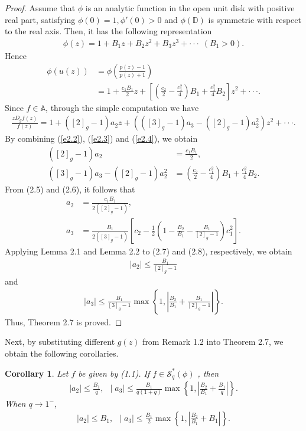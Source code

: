 \documentclass[11pt,twoside, reqno]{article}
\newtheorem{corollary}[theorem]{Corollary}
\theoremstyle{definition}
\begin{document}
\begin{proof}
Assume that $\phi$ is an analytic function in the open unit disk with positive real part, satisfying $\phi(0)=1, \phi'(0)>0$ and $\phi(\mathbb{D})$ is symmetric with respect to the real axis. Then, it has the following representation
\begin{align}
\phi(z)=1+B_{1}z+B_{2}z^{2}+B_{3}z^{3}+\cdot\cdot\cdot\ \ (B_{1}>0)\nonumber.
\end{align}
Hence
\begin{align}\nonumber\label{e2.3}
\phi(u(z))&=\phi\left(\frac{p(z) - 1}{p(z) + 1}\right)\\
&=1+\frac{c_{1}B_{1}}{2}z+\left[\left(\frac{c_{2}}{2}-\frac{c_{1}^{2}}{4}\right)B_{1}+\frac{c_{1}^{2}}{4}B_{2}\right]z^{2}+\cdot\cdot\cdot.
\end{align}
Since $f\in \mathbb{A} $, through the simple computation we have
\begin{align}\label{e2.4}
\frac{zD_{g}f(z)}{f(z)}=1+\left([2]_{g}-1\right)a_{2}z+\left(([3]_{g}-1)a_{3}-([2]_{g}-1)a_{2}^{2}\right)z^{2}+\cdot\cdot\cdot.
\end{align}
By combining (\ref{e2.2}), (\ref{e2.3}) and (\ref{e2.4}), we obtain
\begin{align}
\left([2]_{g}-1\right)a_{2} &= \frac{c_{1}B_{1}}{2}, \\
([3]_{g}-1)a_{3}-([2]_{g}-1)a_{2}^{2} &= \left(\frac{c_{2}}{2}-\frac{c_{1}^{2}}{4}\right)B_{1}+\frac{c_{1}^{2}}{4}B_{2}.
\end{align}
From (2.5) and (2.6), it follows that
\begin{align}
a_{2} &= \frac{c_1B_{1}}{2([2]_{g}-1)}, \\
a_{3} &= \frac{B_{1}}{2([3]_{g}-1)}\left[c_{2}-\frac{1}{2}\left(1-\frac{B_{2}}{B_{1}}-\frac{B_{1}}{[2]_{g}-1}\right)c_{1}^{2}\right].
\end{align}
Applying Lemma 2.1 and Lemma 2.2 to (2.7) and (2.8), respectively, we obtain
\begin{align}
\mid a_{2}\mid \leq \frac{B_{1}}{[2]_{g}-1}\nonumber
\end{align}
and
\begin{align}\nonumber
\mid a_{3}\mid \leq\frac{B_{1}}{[3]_{g}-1}\max\left\{1, \left|\frac{B_{2}}{B_{1}}+\frac{B_{1}}{[2]_{g}-1}\right|\right\}.\nonumber
\end{align}
Thus, Theorem 2.7 is proved.
\end{proof}
Next, by substituting different $g(z)$  from Remark 1.2 into Theorem 2.7, we obtain the following corollaries.

\begin{corollary}
Let $f$ be given by (1.1). If $f\in\mathcal{S}^{\ast }_{q}(\phi)$ , then
\begin{align}
\mid a_{2}\mid \leq \frac{B_{1}}{q}\nonumber,\ \
\mid a_{3}\mid \leq\frac{B_{1}}{q(1+q)}\max\left\{1, \left|\frac{B_{2}}{B_{1}}+\frac{B_{1}}{q}\right|\right\}.\nonumber
\end{align}
When $q\rightarrow1^{-}$,
\begin{align}
\mid a_{2}\mid \leq B_{1}\nonumber,\ \
\mid a_{3}\mid \leq\frac{B_{1}}{2}\max\left\{1, \left|\frac{B_{2}}{B_{1}}+B_{1}\right|\right\}.\nonumber
\end{align}
\end{corollary}
\end{document}
